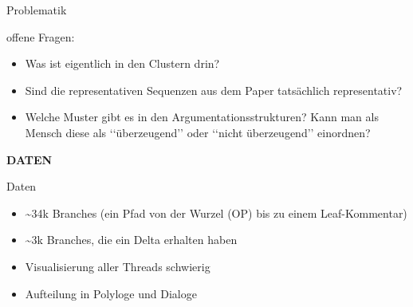 \documentclass[compress,12pt]{beamer}
\begin{document}
    \begin{frame}{Problematik}
        \item offene Fragen:
        \begin{itemize}
            \item Was ist eigentlich in den Clustern drin?
            \item Sind die representativen Sequenzen aus dem Paper tatsächlich representativ?
            \item Welche Muster gibt es in den Argumentationsstrukturen?
            Kann man als Mensch diese als \lq\lq{}überzeugend\rq\rq{} oder \lq\lq{}nicht überzeugend\rq\rq{} einordnen?
        \end{itemize}
    \end{frame}

    \End

    \begin{frame}
        \centering
        \textbf{DATEN}
    \end{frame}


    \begin{frame}{Daten}
        \begin{itemize}
            \item \textasciitilde 34k Branches (ein Pfad von der Wurzel (OP) bis zu einem Leaf-Kommentar)
            \item \textasciitilde 3k Branches, die ein Delta erhalten haben
            \item \textrightarrow{} Visualisierung aller Threads schwierig
            \item Aufteilung in Polyloge und Dialoge
        \end{itemize}
    \end{frame}
\end{document}

